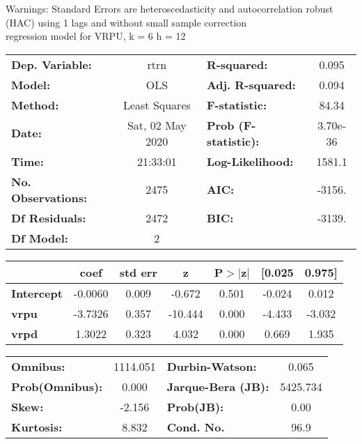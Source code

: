 Warnings: \newline
 [1] Standard Errors are heteroscedasticity and autocorrelation robust (HAC) using 1 lags and without small sample correction\\ 

regression model for VRPU, k = 6 h = 12\begin{center}
\begin{tabular}{lclc}
\toprule
\textbf{Dep. Variable:}    &       rtrn       & \textbf{  R-squared:         } &     0.095   \\
\textbf{Model:}            &       OLS        & \textbf{  Adj. R-squared:    } &     0.094   \\
\textbf{Method:}           &  Least Squares   & \textbf{  F-statistic:       } &     84.34   \\
\textbf{Date:}             & Sat, 02 May 2020 & \textbf{  Prob (F-statistic):} &  3.70e-36   \\
\textbf{Time:}             &     21:33:01     & \textbf{  Log-Likelihood:    } &    1581.1   \\
\textbf{No. Observations:} &        2475      & \textbf{  AIC:               } &    -3156.   \\
\textbf{Df Residuals:}     &        2472      & \textbf{  BIC:               } &    -3139.   \\
\textbf{Df Model:}         &           2      & \textbf{                     } &             \\
\bottomrule
\end{tabular}
\begin{tabular}{lcccccc}
                   & \textbf{coef} & \textbf{std err} & \textbf{z} & \textbf{P$> |$z$|$} & \textbf{[0.025} & \textbf{0.975]}  \\
\midrule
\textbf{Intercept} &      -0.0060  &        0.009     &    -0.672  &         0.501        &       -0.024    &        0.012     \\
\textbf{vrpu}      &      -3.7326  &        0.357     &   -10.444  &         0.000        &       -4.433    &       -3.032     \\
\textbf{vrpd}      &       1.3022  &        0.323     &     4.032  &         0.000        &        0.669    &        1.935     \\
\bottomrule
\end{tabular}
\begin{tabular}{lclc}
\textbf{Omnibus:}       & 1114.051 & \textbf{  Durbin-Watson:     } &    0.065  \\
\textbf{Prob(Omnibus):} &   0.000  & \textbf{  Jarque-Bera (JB):  } & 5425.734  \\
\textbf{Skew:}          &  -2.156  & \textbf{  Prob(JB):          } &     0.00  \\
\textbf{Kurtosis:}      &   8.832  & \textbf{  Cond. No.          } &     96.9  \\
\bottomrule
\end{tabular}
\end{center}

